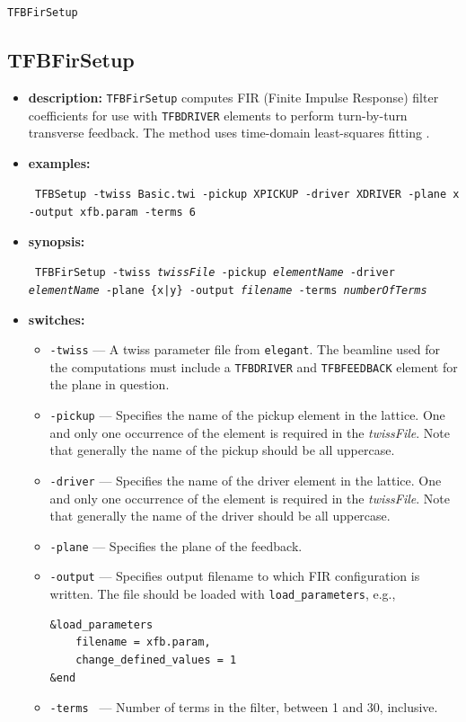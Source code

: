 \documentclass[11pt]{article}
\begin{document}
\newpage
\begin{center}{\Large\verb|TFBFirSetup|}\end{center}
\subsection{TFBFirSetup}

\begin{itemize}

\item {\bf description:} \verb|TFBFirSetup| computes FIR (Finite Impulse Response) filter
  coefficients for use with \verb|TFBDRIVER| elements to perform turn-by-turn transverse
  feedback. The method uses time-domain least-squares fitting \cite{Nakamura2004}.
  
\item {\bf examples:}
\begin{flushleft}{\tt
TFBSetup -twiss Basic.twi -pickup XPICKUP -driver XDRIVER -plane x -output xfb.param -terms 6
}\end{flushleft}

\item {\bf synopsis:}
\begin{flushleft}{\tt 
TFBFirSetup -twiss {\em twissFile} -pickup {\em elementName} -driver {\em elementName} -plane \{x|y\} 
-output {\em filename} -terms {\em numberOfTerms}
}\end{flushleft}

\item {\bf switches:}
\begin{itemize}
\item {\tt -twiss} --- A twiss parameter file from {\tt elegant}. 
The beamline used for the computations must include a \verb|TFBDRIVER| and
\verb|TFBFEEDBACK| element for the plane in question.
\item {\tt -pickup} --- Specifies the name of the pickup element in the lattice.
  One and only one occurrence of the element is required in the {\em twissFile}.
  Note that generally the name of the pickup should be all uppercase.
\item {\tt -driver} --- Specifies the name of the driver element in the lattice.
  One and only one occurrence of the element is required in the {\em twissFile}.
  Note that generally the name of the driver should be all uppercase.
\item {\tt -plane} --- Specifies the plane of the feedback.
\item {\tt -output} --- Specifies output filename to which FIR configuration is written.
  The file should be loaded with \verb|load_parameters|, e.g.,
\begin{verbatim}
&load_parameters
    filename = xfb.param,
    change_defined_values = 1
&end
\end{verbatim}
\item {\tt -terms } --- Number of terms in the filter, between 1 and 30, inclusive.
\end{itemize}


\end{itemize}
\end{document}
